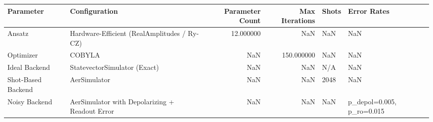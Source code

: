 \begin{tabular}{llrrll}
\toprule
Parameter & Configuration & Parameter Count & Max Iterations & Shots & Error Rates \\
\midrule
Ansatz & Hardware-Efficient (RealAmplitudes / Ry-CZ) & 12.000000 & NaN & NaN & NaN \\
Optimizer & COBYLA & NaN & 150.000000 & NaN & NaN \\
Ideal Backend & StatevectorSimulator (Exact) & NaN & NaN & N/A & NaN \\
Shot-Based Backend & AerSimulator & NaN & NaN & 2048 & NaN \\
Noisy Backend & AerSimulator with Depolarizing + Readout Error & NaN & NaN & NaN & p_depol=0.005, p_ro=0.015 \\
\bottomrule
\end{tabular}
